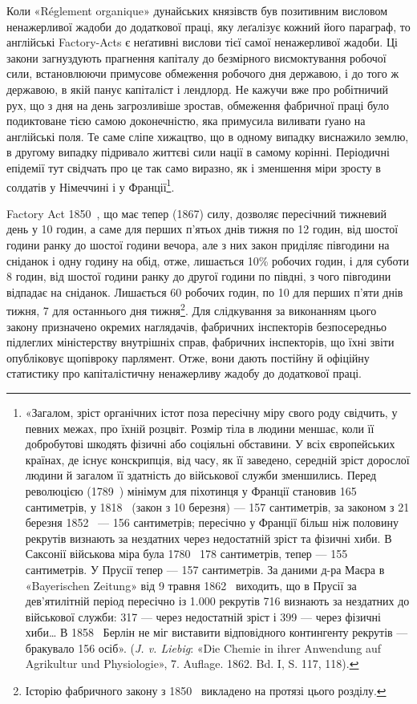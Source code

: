 Коли «Réglement organique» дунайських князівств був позитивним
висловом ненажерливої жадоби до додаткової праці, яку
леґалізує кожний його параграф, то англійські Factory-Acts
є неґативні вислови тієї самої ненажерливої жадоби. Ці закони
загнуздують прагнення капіталу до безмірного висмоктування
робочої сили, встановлюючи примусове обмеження робочого дня
державою, і до того ж державою, в якій панує капіталіст і лендлорд.
Не кажучи вже про робітничий рух, що з дня на день загрозливіше
зростав, обмеження фабричної праці було подиктоване
тією самою доконечністю, яка примусила виливати ґуано
на англійські поля. Те саме сліпе хижацтво, що в одному випадку
виснажило землю, в другому випадку підривало життєві сили
нації в самому корінні. Періодичні епідемії тут свідчать про це
так само виразно, як і зменшення міри зросту в солдатів у Німеччині
і у Франції\footnote{
«Загалом, зріст органічних істот поза пересічну міру свого роду
свідчить, у певних межах, про їхній розцвіт. Розмір тіла в людини меншає,
коли її добробутові шкодять фізичні або соціяльні обставини. У всіх європейських
країнах, де існує конскрипція, від часу, як її заведено, середній
зріст дорослої людини й загалом її здатність до військової служби зменшились.
Перед революцією (1789~) мінімум для піхотинця у Франції
становив 165 сантиметрів, у 1818~ (закон з 10 березня) — 157 сантиметрів,
за законом з 21 березня 1852~ — 156 сантиметрів; пересічно у Франції
більш ніж половину рекрутів визнають за нездатних через недостатній
зріст та фізичні хиби. В Саксонії військова міра була 1780~ 178 сантиметрів,
тепер — 155 сантиметрів. У Прусії тепер — 157 сантиметрів. За даними
д-ра Маєра в «Bayerischen Zeitung» від 9 травня 1862~ виходить,
що в Прусії за дев’ятилітній період пересічно із \num{1.000} рекрутів 716 визнають
за нездатних до військової служби: 317 — через недостатній зріст і
399 — через фізичні хиби\dots{} В 1858~ Берлін не міг виставити відповідного
контингенту рекрутів — бракувало 156 осіб». (\emph{J. v. Liebig}: «Die
Chemie in ihrer Anwendung auf Agrikultur und Physiologie», 7. Auflage.
1862. Bd. I, S. 117, 118).
}.

Factory Act 1850~, що має тепер (1867) силу, дозволяє пересічний
тижневий день у 10 годин, а саме для перших п’ятьох
днів тижня по 12 годин, від шостої години ранку до шостої години
вечора, але з них закон приділяє півгодини на сніданок і
одну годину на обід, отже, лишається 10\% робочих годин, і для
суботи 8 годин, від шостої години ранку до другої години по
півдні, з чого півгодини відпадає на сніданок. Лишається 60 робочих
годин, по 10 для перших п’яти днів тижня, 7 для
останнього дня тижня\footnote{
Історію фабричного закону з 1850~ викладено на протязі цього
розділу.
}. Для слідкування за виконанням цього
закону призначено окремих наглядачів, фабричних інспекторів
безпосередньо підлеглих міністерству внутрішніх справ, фабричних
інспекторів, що їхні звіти опубліковує щопівроку парлямент.
Отже, вони дають постійну й офіційну статистику про капіталістичну
ненажерливу жадобу до додаткової праці.

